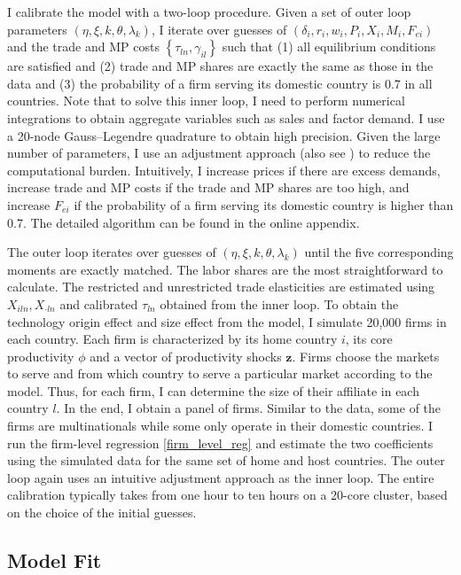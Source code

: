 \documentclass[notitlepage,11pt]{article}%
\begin{document}
I calibrate the model with a two-loop procedure. Given a set of outer loop
parameters $\left(  \eta,\xi,k,\theta,\lambda_{k}\right)  $, I iterate over
guesses of $\left(  \delta_{i},r_{i},w_{i},P_{i},X_{i},M_{i},F_{ei}\right)  $
and the trade and MP costs $\left\{  \tau_{ln},\gamma_{il}\right\}  $ such
that (1) all equilibrium conditions are satisfied and (2) trade and MP shares
are exactly the same as those in the data and (3) the probability of a firm
serving its domestic country is 0.7 in all countries. Note that to solve this
inner loop, I need to perform numerical integrations to obtain aggregate
variables such as sales and factor demand. I use a 20-node Gauss--Legendre
quadrature to obtain high precision. Given the large number of parameters, I
use an adjustment approach (also see \cite{burstein_international_2015}) to
reduce the computational burden. Intuitively, I increase prices if there are
excess demands, increase trade and MP costs if the trade and MP shares are too
high, and increase $F_{ei}$ if the probability of a firm serving its domestic
country is higher than 0.7. The detailed algorithm can be found in the online appendix.

The outer loop iterates over guesses of $\left(  \eta,\xi,k,\theta,\lambda
_{k}\right)  $ until the five corresponding moments are exactly matched. The
labor shares are the most straightforward to calculate. The restricted and
unrestricted trade elasticities are estimated using $X_{iln},X_{\cdot ln}$ and
calibrated $\tau_{ln}$ obtained from the inner loop. To obtain the technology
origin effect and size effect from the model, I simulate 20,000 firms in each
country. Each firm is characterized by its home country $i$, its core
productivity $\phi$ and a vector of productivity shocks $\mathbf{z}$. Firms
choose the markets to serve and from which country to serve a particular
market according to the model. Thus, for each firm, I can determine the size
of their affiliate in each country $l$. In the end, I obtain a panel of firms.
Similar to the data, some of the firms are multinationals while some only
operate in their domestic countries. I run the firm-level regression
\ref{firm_level_reg} and estimate the two coefficients using the simulated
data for the same set of home and host countries. The outer loop again uses an
intuitive adjustment approach as the inner loop. The entire calibration
typically takes from one hour to ten hours on a 20-core cluster, based on the
choice of the initial guesses.

\subsection{Model Fit}
\end{document}
